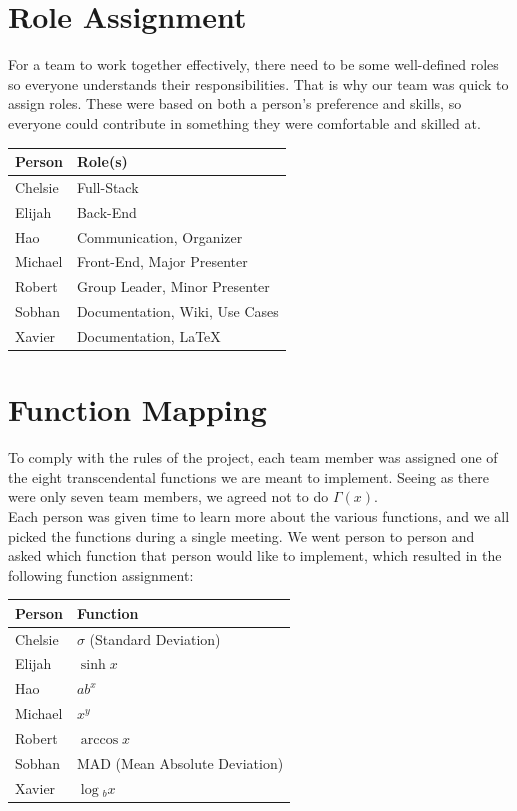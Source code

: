 \documentclass[11pt,onside]{report}
\begin{document}
\section{Role Assignment}
For a team to work together effectively, there need to be some well-defined roles so everyone understands their responsibilities. That is why our team was quick to assign roles. These were based on both a person's preference and skills, so everyone could contribute in something they were comfortable and skilled at.
\begin{center}
\begin{tabular}{|l|l|}
    \hline
    \bf{Person} & \bf{Role(s)}  \\
    \hline
    Chelsie & Full-Stack \\
    \hline
    Elijah & Back-End \\
    \hline
    Hao & Communication, Organizer \\
    \hline
    Michael & Front-End, Major Presenter \\
    \hline
    Robert & Group Leader, Minor Presenter \\
    \hline
    Sobhan & Documentation, Wiki, Use Cases \\
    \hline
    Xavier & Documentation, \LaTeX{} \\
    \hline
\end{tabular}
\end{center}

\section{Function Mapping}
To comply with the rules of the project, each team member was assigned one of the eight transcendental functions we are meant to implement. Seeing as there were only seven team members, we agreed not to do $\Gamma{}(x)$. \\

Each person was given time to learn more about the various functions, and we all picked the functions during a single meeting. We went person to person and asked which function that person would like to implement, which resulted in the following function assignment:
\begin{center}
\begin{tabular}{|l|l|}
    \hline
    \bf{Person} & \bf{Function}  \\
    \hline
    Chelsie & $\sigma{}$ (Standard Deviation) \\
    \hline
    Elijah & $\sinh{x}$ \\
    \hline
    Hao & $ab^x$ \\
    \hline
    Michael & $x^y$ \\
    \hline
    Robert & $\arccos{x}$ \\
    \hline
    Sobhan & MAD (Mean Absolute Deviation) \\
    \hline
    Xavier & $\log{}_bx$ \\
    \hline
\end{tabular}
\end{center}
\end{document}

